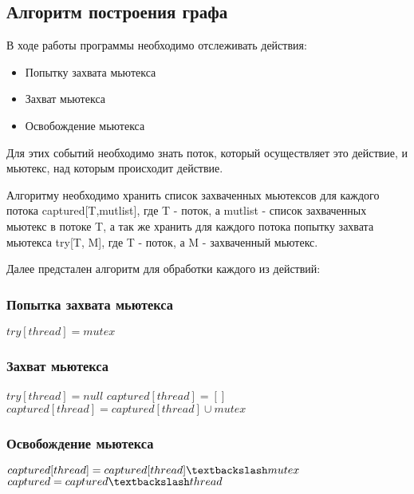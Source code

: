 \documentclass[runningheads, extrasrussian]{llncs}
\begin{document}
\subsection{Алгоритм построения графа}

В ходе работы программы необходимо отслеживать действия:
\begin{itemize}
  \item Попытку захвата мьютекса
  \item Захват мьютекса
  \item Освобождение мьютекса
\end{itemize}

Для этих событий необходимо знать поток, который осуществляет это действие, и мьютекс, над которым происходит действие.

Алгоритму необходимо хранить список захваченных мьютексов для каждого потока captured[T,mutlist], где T - поток, а mutlist - список захваченных мьютекс в потоке T, а так же хранить для каждого потока попытку захвата мьютекса try[T, M], где T - поток, а M - захваченный мьютекс.

Далее предстален алгоритм для обработки каждого из действий:

\subsubsection{Попытка захвата мьютекса}
\begin{algorithmic}
    \State $try[thread] = mutex$
\EndFunction
\end{algorithmic}

\subsubsection{Захват мьютекса}
\begin{algorithmic}
    \State $try[thread] = null$
        \State $captured[thread] = []$
    \EndIf
    \State $captured[thread] = captured[thread] \cup mutex$
\EndFunction
\end{algorithmic}

\subsubsection{Освобождение мьютекса}
\begin{algorithmic}
    \State $captured[thread] = captured[thread] \textbackslash mutex$
        \State $captured = captured \textbackslash thread$
    \EndIf
\EndFunction
\end{algorithmic}
\end{document}
